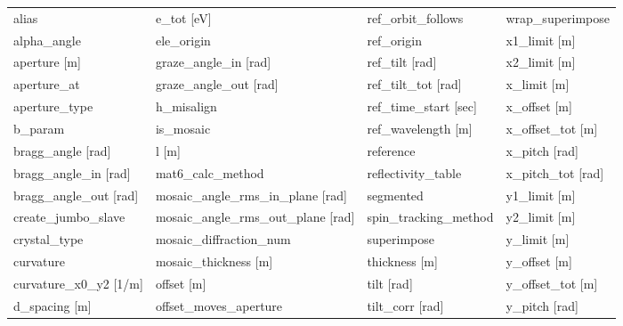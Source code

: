  \begin{tabular}{llll} \toprule
alias                            & e_tot [eV]                       & ref_orbit_follows                & wrap_superimpose                 \\
alpha_angle                      & ele_origin                       & ref_origin                       & x1_limit [m]                     \\
aperture [m]                     & graze_angle_in [rad]             & ref_tilt [rad]                   & x2_limit [m]                     \\
aperture_at                      & graze_angle_out [rad]            & ref_tilt_tot [rad]               & x_limit [m]                      \\
aperture_type                    & h_misalign                       & ref_time_start [sec]             & x_offset [m]                     \\
b_param                          & is_mosaic                        & ref_wavelength [m]               & x_offset_tot [m]                 \\
bragg_angle [rad]                & l [m]                            & reference                        & x_pitch [rad]                    \\
bragg_angle_in [rad]             & mat6_calc_method                 & reflectivity_table               & x_pitch_tot [rad]                \\
bragg_angle_out [rad]            & mosaic_angle_rms_in_plane [rad]  & segmented                        & y1_limit [m]                     \\
create_jumbo_slave               & mosaic_angle_rms_out_plane [rad] & spin_tracking_method             & y2_limit [m]                     \\
crystal_type                     & mosaic_diffraction_num           & superimpose                      & y_limit [m]                      \\
curvature                        & mosaic_thickness [m]             & thickness [m]                    & y_offset [m]                     \\
curvature_x0_y2 [1/m]            & offset [m]                       & tilt [rad]                       & y_offset_tot [m]                 \\
d_spacing [m]                    & offset_moves_aperture            & tilt_corr [rad]                  & y_pitch [rad]                    \\

\end{tabular}

